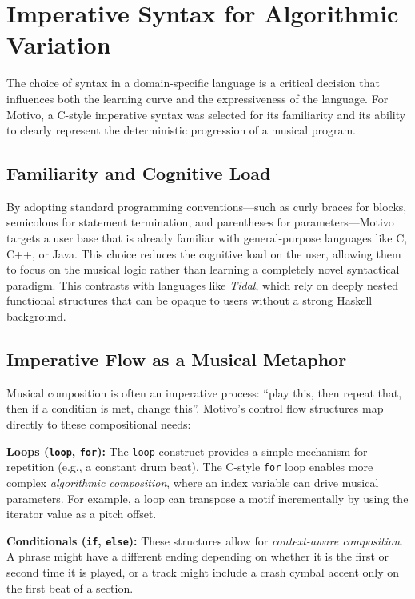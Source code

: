 \section{Imperative Syntax for Algorithmic Variation}\label{sec:syntax-design}

The choice of syntax in a domain-specific language is a critical decision that influences both the learning curve and
the expressiveness of the language.
For Motivo, a C-style imperative syntax was selected for its familiarity and its ability to clearly represent
the deterministic progression of a musical program.

\subsection{Familiarity and Cognitive Load}\label{detail-subsec:familiarity-and-cognitive-load}

By adopting standard programming conventions---such as curly braces for blocks, semicolons for statement
termination, and
parentheses for parameters---Motivo targets a user base that is already familiar with general-purpose languages like C,
C++, or Java.
This choice reduces the cognitive load on the user, allowing them to focus on the musical logic rather than learning a
completely novel syntactical paradigm.
This contrasts with languages like \textit{Tidal}, which rely on deeply nested functional structures that can be opaque
to users without a strong Haskell background.

\subsection{Imperative Flow as a Musical Metaphor}\label{detail-subsec:imperative-flow-as-a-musical-metaphor}

Musical composition is often an imperative process: ``play this, then repeat that, then if a condition is met, change
this''.
Motivo's control flow structures map directly to these compositional needs:

\noindent \textbf{Loops (\texttt{loop}, \texttt{for}):} The \texttt{loop} construct provides a simple mechanism for
repetition (e.g., a constant drum beat).
The C-style \texttt{for} loop enables more complex \textit{algorithmic composition}, where an index variable can
drive musical parameters.
For example, a loop can transpose a motif incrementally by using the iterator value as a pitch offset.

\noindent \textbf{Conditionals (\texttt{if}, \texttt{else}):} These structures allow for \textit{context-aware
composition}.
A phrase might have a different ending depending on whether it is the first or second time it is played, or a track
might include a crash cymbal accent only on the first beat of a section.

